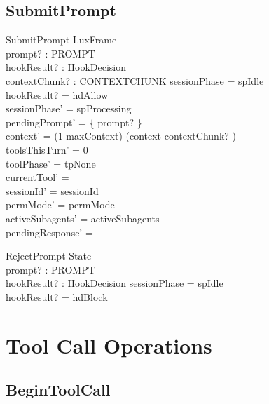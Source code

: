 \documentclass[a4paper,10pt,fleqn]{article}
\begin{document}
\subsection{SubmitPrompt}

\begin{schema}{SubmitPrompt}
  LuxFrame \\
  prompt? : PROMPT \\
  hookResult? : HookDecision \\
  contextChunk? : CONTEXTCHUNK
  \where
  sessionPhase = spIdle \\
  hookResult? = hdAllow \\
  sessionPhase' = spProcessing \\
  pendingPrompt' = \{ prompt? \} \\
  context' = (1 \upto maxContext) \dres (context \cat \langle contextChunk? \rangle) \\
  toolsThisTurn' = 0 \\
  toolPhase' = tpNone \\
  currentTool' = \emptyset \\
  sessionId' = sessionId \\
  permMode' = permMode \\
  activeSubagents' = activeSubagents \\
  pendingResponse' = \emptyset
\end{schema}

\begin{schema}{RejectPrompt}
  \Xi State \\
  prompt? : PROMPT \\
  hookResult? : HookDecision
  \where
  sessionPhase = spIdle \\
  hookResult? = hdBlock
\end{schema}

\section{Tool Call Operations}

\subsection{BeginToolCall}
\end{document}
